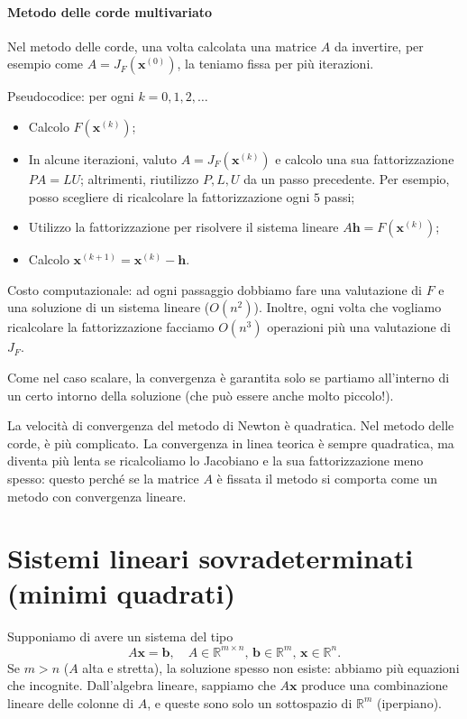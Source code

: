 \documentclass[a4paper]{report}
\theoremstyle{definiton}
\theoremstyle{remark}
\newcommand{\x}{\mathbf{x}}
\renewcommand{\b}{\mathbf{b}}
\begin{document}
\paragraph{Metodo delle corde multivariato}  Nel metodo delle corde, una volta calcolata una matrice $A$ da invertire, per esempio come $A = J_F(\x^{(0)})$, la teniamo fissa per più iterazioni.

Pseudocodice: per ogni $k=0,1,2,\dots$
\begin{itemize}
    \item Calcolo $F(\x^{(k)})$;
    \item In alcune iterazioni, valuto $A = J_F(\x^{(k)})$ e calcolo una sua fattorizzazione $PA = LU$; altrimenti, riutilizzo $P,L,U$ da un passo precedente. Per esempio, posso scegliere di ricalcolare la fattorizzazione ogni $5$ passi;
    \item Utilizzo la fattorizzazione per risolvere il sistema lineare $ A \mathbf{h} = F(\x^{(k)})$;
    \item Calcolo $\x^{(k+1)} = \x^{(k)} - \mathbf{h}$.
\end{itemize}
Costo computazionale: ad ogni passaggio dobbiamo fare una valutazione di $F$ e una soluzione di un sistema lineare ($O(n^2)$). Inoltre, ogni volta che vogliamo ricalcolare la fattorizzazione facciamo $O(n^3)$ operazioni più una valutazione di $J_F$. 

Come nel caso scalare, la convergenza è garantita solo se partiamo all'interno di un certo intorno della soluzione (che può essere anche molto piccolo!).

La velocità di convergenza del metodo di Newton è quadratica. Nel metodo delle corde, è più complicato. La convergenza in linea teorica è sempre quadratica, ma diventa più lenta se ricalcoliamo lo Jacobiano e la sua fattorizzazione meno spesso: questo perché se la matrice $A$ è fissata il metodo si comporta come un metodo con convergenza lineare.

\section{Sistemi lineari sovradeterminati (minimi quadrati)}

Supponiamo di avere un sistema del tipo
\[
A\x = \b, \quad A \in \mathbb{R}^{m\times n}, \, \b\in\mathbb{R}^m, \, \x\in\mathbb{R}^n.
\]
Se $m>n$ ($A$ alta e stretta), la soluzione spesso non esiste: abbiamo più equazioni che incognite. Dall'algebra lineare, sappiamo che $A\x$ produce una combinazione lineare delle colonne di $A$, e queste sono solo un sottospazio di $\mathbb{R}^m$ (iperpiano).
\end{document}
